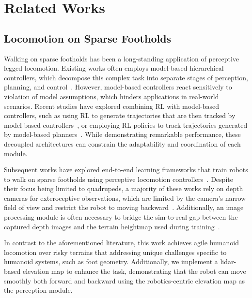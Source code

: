 \section{Related Works}

\subsection{Locomotion on Sparse Footholds}

Walking on sparse footholds has been a long-standing application of perceptive legged locomotion. Existing works often employs model-based hierarchical controllers, which decompose this complex task into separate stages of perception, planning, and control~\cite{grandia2023perceptive, griffin2019footstep, jenelten2020perceptive, mastalli2020motion, melon2021receding, winkler2018gait}. However, model-based controllers react sensitively to violation of model assumptions, which hinders applications in real-world scenarios. Recent studies have explored combining RL with model-based controllers, such as using RL to generate trajectories that are then tracked by model-based controllers~\cite{gangapurwala2022rloc, yu2021visual, xie2022glide}, or employing RL policies to track trajectories generated by model-based planners~\cite{jenelten2024dtc}. While demonstrating remarkable performance, these decoupled architectures can constrain the adaptability and coordination of each module.

Subsequent works have explored end-to-end learning frameworks that train robots to walk on sparse footholds using perceptive locomotion controllers~\cite{agarwal2023legged, cheng2024extreme, yang2023neural, yu2024walking, Zhang2023LearningAL}. Despite their focus being limited to quadrupeds, a majority of these works rely on depth cameras for exteroceptive observations, which are limited by the camera's narrow field of view and restrict the robot to moving backward~\cite{agarwal2023legged, cheng2024extreme, yang2023neural, yu2024walking}. Additionally, an image processing module is often necessary to bridge the sim-to-real gap between the captured depth images and the terrain heightmap used during training~\cite{agarwal2023legged, cheng2024extreme, yang2023neural, yu2024walking}.

In contrast to the aforementioned literature, this work achieves agile humanoid locomotion over risky terrains that addressing unique challenges specific to humanoid systems, such as foot geometry. Additionally, we implement a lidar-based elevation map to enhance the task, demonstrating that the robot can move smoothly both forward and backward using the robotics-centric elevation map as the perception module.


